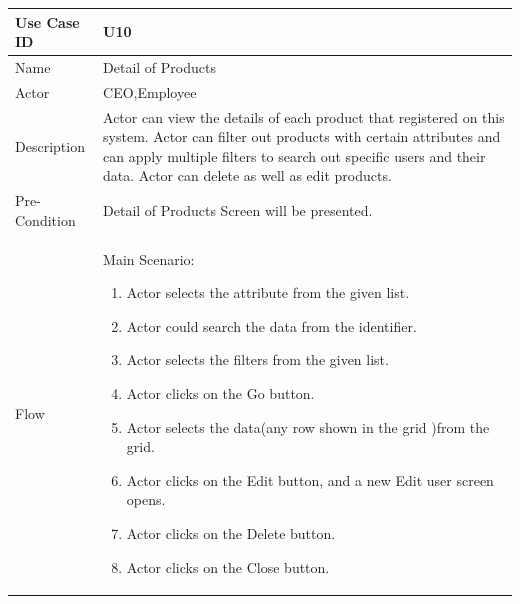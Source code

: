 \documentclass[12pt,a4paper]{report}
\begin{document}
\begin{tabular}{ | m{3cm} | m{12cm}| } \hline

Use Case ID & U10  \\\hline

Name  	    & Detail of Products  \\ \hline

Actor     	& CEO,Employee\\ \hline

Description &  Actor can view the details of each product that registered on this system. Actor can filter out products with certain attributes and can apply multiple filters to search out specific users and  their data. Actor can delete as well as edit products.\\ \hline

Pre-Condition &  Detail of Products Screen will be  presented. \\ \hline

Flow       & Main Scenario:

\begin{enumerate}
\item  Actor selects the attribute from the given list. 
\item  Actor could search the data from the identifier.
\item  Actor selects the filters from the given list.
\item  Actor clicks on the Go button.
\item  Actor selects the data(any row shown in the grid )from the grid. 
\item  Actor clicks on the Edit button, and a new Edit user screen opens.
\item  Actor clicks on the Delete button.
\item  Actor clicks on the Close button.


\end{enumerate}\\ \hline
\end{tabular}
\end{document}
